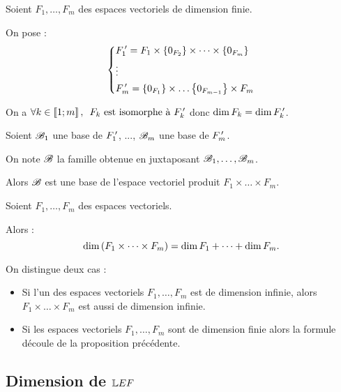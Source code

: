 \begin{prop}
Soient \(F_1,\dots,F_m\) des espaces vectoriels de dimension finie.

On pose : \[\begin{dcases}
F_1^{\,\prime}=F_1\times\left\lbrace0_{F_2}\right\rbrace\times\dots\times\left\lbrace0_{F_m}\right\rbrace \\
\vdots \\
F_m^{\,\prime}=\left\lbrace0_{F_1}\right\rbrace\times\dots\left\lbrace0_{F_{m-1}}\right\rbrace\times F_m
\end{dcases}\]

On a \(\quantifs{\forall k\in\interventierii{1}{m}}F_k\text{ est isomorphe à }F_k\prim\) donc \(\dim F_k=\dim F_k^{\,\prime}\).

Soient \(\mathscr{B}_1\) une base de \(F_1^{\,\prime}\), ..., \(\mathscr{B}_m\) une base de \(F_m^{\,\prime}\).

On note \(\mathscr{B}\) la famille obtenue en juxtaposant \(\mathscr{B}_1,\dots,\mathscr{B}_m\).

Alors \(\mathscr{B}\) est une base de l'espace vectoriel produit \(F_1\times\dots\times F_m\).
\end{prop}

\begin{dem}
\end{dem}

\begin{cor}
Soient \(F_1,\dots,F_m\) des espaces vectoriels.

Alors : \[\dim\left(F_1\times\dots\times F_m\right)=\dim F_1+\dots+\dim F_m.\]
\end{cor}

\begin{dem}
On distingue deux cas :

\begin{itemize}
\item Si l'un des espaces vectoriels \(F_1,\dots,F_m\) est de dimension infinie, alors \(F_1\times\dots\times F_m\) est aussi de dimension infinie. \\

\item Si les espaces vectoriels \(F_1,\dots,F_m\) sont de dimension finie alors la formule découle de la proposition précédente.
\end{itemize}
\end{dem}

\subsection{Dimension de \(\mathbb{L}{E}{F}\)}

